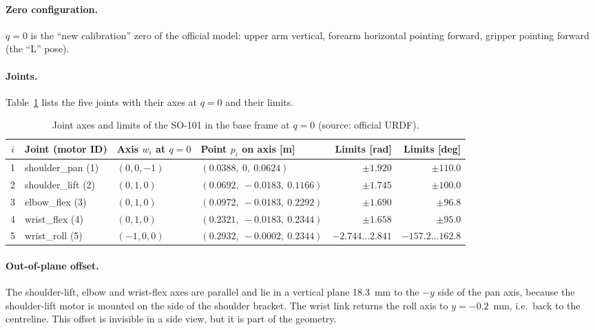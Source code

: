 \documentclass[11pt,a4paper]{article}
\begin{document}
\paragraph{Zero configuration.} $q=0$ is the ``new calibration'' zero of the official model: upper arm vertical, forearm horizontal pointing forward, gripper pointing forward (the ``L'' pose).

\paragraph{Joints.} Table~\ref{tab:joints} lists the five joints with their axes at $q=0$ and their limits.

\begin{table}[htbp]
  \centering
  \small
  \setlength{\tabcolsep}{4pt}
  \caption{Joint axes and limits of the SO-101 in the base frame at $q=0$ (source: official URDF).}
  \label{tab:joints}
  \begin{tabular}{@{}clllrr@{}}
    \toprule
    $i$ & Joint (motor ID) & Axis $w_i$ at $q=0$ & Point $p_i$ on axis [m] & Limits [rad] & Limits [deg] \\
    \midrule
    1 & shoulder\_pan (1)  & $(0,0,-1)$ & $(0.0388,\ 0,\ 0.0624)$       & $\pm 1.920$        & $\pm 110.0$ \\
    2 & shoulder\_lift (2) & $(0,1,0)$  & $(0.0692,\ -0.0183,\ 0.1166)$ & $\pm 1.745$        & $\pm 100.0$ \\
    3 & elbow\_flex (3)    & $(0,1,0)$  & $(0.0972,\ -0.0183,\ 0.2292)$ & $\pm 1.690$        & $\pm 96.8$  \\
    4 & wrist\_flex (4)    & $(0,1,0)$  & $(0.2321,\ -0.0183,\ 0.2344)$ & $\pm 1.658$        & $\pm 95.0$  \\
    5 & wrist\_roll (5)    & $(-1,0,0)$ & $(0.2932,\ -0.0002,\ 0.2344)$ & $-2.744\ldots 2.841$ & $-157.2\ldots 162.8$ \\
    \bottomrule
  \end{tabular}
\end{table}

\paragraph{Out-of-plane offset.} The shoulder-lift, elbow and wrist-flex axes are parallel and lie in a vertical plane 18.3~mm to the $-y$ side of the pan axis, because the shoulder-lift motor is mounted on the side of the shoulder bracket. The wrist link returns the roll axis to $y=-0.2$~mm, i.e.\ back to the centreline. This offset is invisible in a side view, but it is part of the geometry.
\end{document}
